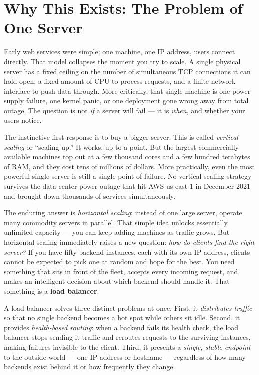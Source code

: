 \documentclass[11pt,a4paper]{article}
\begin{document}
\newpage
\tableofcontents
\newpage

\section{Why This Exists: The Problem of One Server}

Early web services were simple: one machine, one IP address, users connect directly. That model
collapses the moment you try to scale. A single physical server has a fixed ceiling on the number
of simultaneous TCP connections it can hold open, a fixed amount of CPU to process requests, and a
finite network interface to push data through. More critically, that single machine is one power
supply failure, one kernel panic, or one deployment gone wrong away from total outage. The question
is not \emph{if} a server will fail --- it is \emph{when}, and whether your users notice.

The instinctive first response is to buy a bigger server. This is called \emph{vertical scaling} or
``scaling up.'' It works, up to a point. But the largest commercially available machines top out at
a few thousand cores and a few hundred terabytes of RAM, and they cost tens of millions of dollars.
More practically, even the most powerful single server is still a single point of failure. No
vertical scaling strategy survives the data-center power outage that hit AWS us-east-1 in December
2021 and brought down thousands of services simultaneously.

The enduring answer is \emph{horizontal scaling}: instead of one large server, operate many
commodity servers in parallel. That simple idea unlocks essentially unlimited capacity --- you can
keep adding machines as traffic grows. But horizontal scaling immediately raises a new question:
\emph{how do clients find the right server?} If you have fifty backend instances, each with its own
IP address, clients cannot be expected to pick one at random and hope for the best. You need
something that sits in front of the fleet, accepts every incoming request, and makes an intelligent
decision about which backend should handle it. That something is a \textbf{load balancer}.

A load balancer solves three distinct problems at once. First, it \emph{distributes traffic}
so that no single backend becomes a hot spot while others sit idle. Second, it provides
\emph{health-based routing}: when a backend fails its health check, the load balancer stops sending
it traffic and reroutes requests to the surviving instances, making failures invisible to the client.
Third, it presents a \emph{single, stable endpoint} to the outside world --- one IP address or
hostname --- regardless of how many backends exist behind it or how frequently they change.
\end{document}
